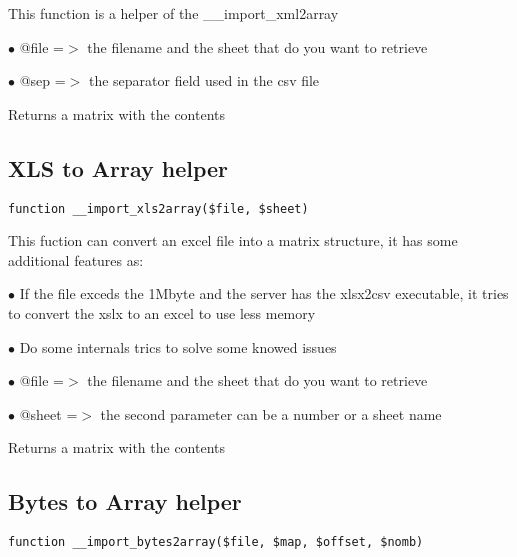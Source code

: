 \documentclass[a4paper]{book}
\begin{document}
This function is a helper of the \_\_import\_xml2array

\begin{compactitem}
\item[\color{myblue}$\bullet$] @file =$>$ the filename and the sheet that do you want to retrieve
\item[\color{myblue}$\bullet$] @sep  =$>$ the separator field used in the csv file
\end{compactitem}

Returns a matrix with the contents

\hypertarget{toc154}{}
\subsection{XLS to Array helper}

\begin{lstlisting}
function __import_xls2array($file, $sheet)
\end{lstlisting}

This fuction can convert an excel file into a matrix structure, it has some additional features as:

\begin{compactitem}
\item[\color{myblue}$\bullet$] If the file exceds the 1Mbyte and the server has the xlsx2csv executable, it tries to convert the xslx
  to an excel to use less memory
\item[\color{myblue}$\bullet$] Do some internals trics to solve some knowed issues
\end{compactitem}

\begin{compactitem}
\item[\color{myblue}$\bullet$] @file  =$>$ the filename and the sheet that do you want to retrieve
\item[\color{myblue}$\bullet$] @sheet =$>$ the second parameter can be a number or a sheet name
\end{compactitem}

Returns a matrix with the contents

\hypertarget{toc155}{}
\subsection{Bytes to Array helper}

\begin{lstlisting}
function __import_bytes2array($file, $map, $offset, $nomb)
\end{lstlisting}
\end{document}
